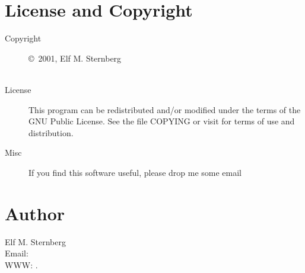 \documentclass[english]{article}
\begin{document}
\section{License and Copyright}

\begin{description}
\item[Copyright] \copyright\ 2001, Elf M. Sternberg \\
          \\

\item[License] This program can be redistributed and/or modified under the
  terms of the GNU Public License.  See the file COPYING or visit
   for terms of use and
  distribution.

\item[Misc] If you find this software useful, please drop me some email
\end{description}

\section{Author}

\noindent
Elf M. Sternberg                      \\
Email:         \\
WWW: .
\LatexManEnd
\end{document}
